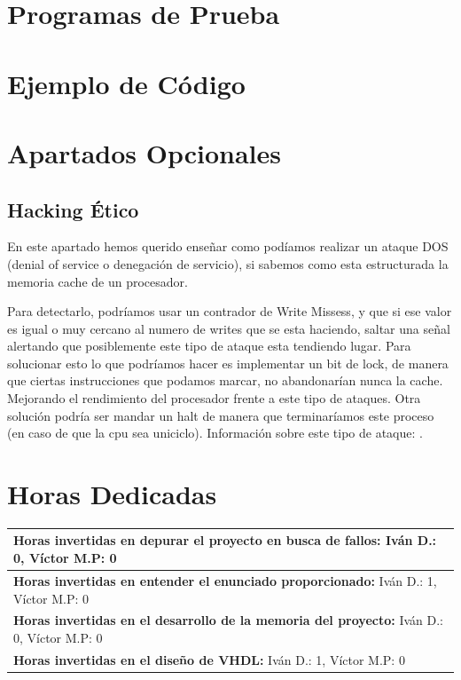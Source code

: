 \documentclass{article}
\newcommand{\horasVhdl}[2]{\textbf{Horas invertidas en el diseño de VHDL:} Iván D.: #1, Víctor M.P: #2\par\nointerlineskip}
\newcommand{\horasEntenderEnunciado}[2]{\textbf{Horas invertidas en entender el enunciado proporcionado:} Iván D.: #1, Víctor M.P: #2\par\nointerlineskip}
\newcommand{\horasDepuracion}[2]{\textbf{Horas invertidas en depurar el proyecto en busca de fallos:} Iván D.: #1, Víctor M.P: #2\par\nointerlineskip}
\newcommand{\horasMemoria}[2]{\textbf{Horas invertidas en el desarrollo de la memoria del proyecto:} Iván D.: #1, Víctor M.P: #2\par\nointerlineskip}
\begin{document}
\section{Programas de Prueba}
\lipsum[10-12]

\section{Ejemplo de Código}
\lipsum[13-14]

\section{Apartados Opcionales}
\subsection{Hacking Ético}
En este apartado hemos querido enseñar como podíamos realizar un ataque DOS (denial of service o denegación de servicio), si sabemos como esta estructurada la memoria cache de un procesador.\par
Para detectarlo, podríamos usar un contrador de Write Missess, y que si ese valor es igual o muy cercano al numero de writes que se esta haciendo, saltar una señal alertando que posiblemente este tipo de ataque esta tendiendo lugar. 
Para solucionar esto lo que podríamos hacer es implementar un bit de lock, de manera que ciertas instrucciones que podamos marcar, no abandonarían nunca la cache. Mejorando el rendimiento del procesador frente a este tipo de ataques. Otra solución podría ser mandar un 
halt de manera que terminaríamos este proceso (en caso de que la cpu sea uniciclo). 
Información sobre este tipo de ataque: \cite{BackCache}.

\newpage

\section{Horas Dedicadas}

\begin{table}[h]
\centering
\begin{tabularx}{\textwidth}{|X|}
\hline
\horasDepuracion{0}{0} \\
\hline
\horasEntenderEnunciado{1}{0} \\
\hline
\horasMemoria{0}{0} \\
\hline
\horasVhdl{1}{0} \\
\hline
\end{tabularx}
\end{table}
\end{document}
